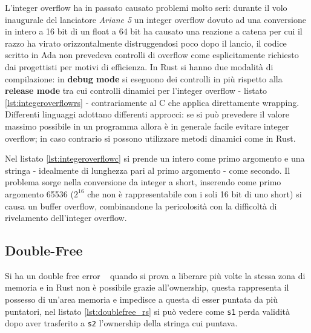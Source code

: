 \documentclass{report}
\begin{document}
L'integer overflow ha in passato causato problemi molto seri: durante il volo inaugurale del lanciatore \textit{Ariane 5} un integer overflow dovuto ad una conversione in intero a 16 bit di un float a 64 bit ha causato una reazione a catena per cui il razzo ha virato orizzontalmente distruggendosi poco dopo il lancio, il codice scritto in Ada non prevedeva controlli di overflow come esplicitamente richiesto dai progettisti per motivi di efficienza. In Rust si hanno due modalità di compilazione: in \textbf{debug mode} si eseguono dei controlli in più rispetto alla \textbf{release mode} tra cui controlli dinamici per l'integer overflow - listato \ref{lst:integeroverflowrs} - contrariamente al C che applica direttamente wrapping. \\
Differenti linguaggi adottano differenti approcci: se si può prevedere il valore massimo possibile in un programma allora è in generale facile evitare integer overflow; in caso contrario si possono utilizzare metodi dinamici come in Rust. 




Nel listato \ref{lst:integeroverflowc} si prende un intero come primo argomento e una stringa - idealmente di lunghezza pari al primo argomento - come secondo. Il problema sorge nella conversione da integer a short, inserendo come primo argomento 65536 ($2^{16}$ che non è rappresentabile con i soli 16 bit di uno short) si causa un buffer overflow, combinandone la pericolosità con la difficoltà di rivelamento dell'integer overflow.




\subsection{Double-Free} \label{sec:double_free}
Si ha un double free error ~\cite[10.4.4]{gollmann:computersecurity} quando si prova a liberare più volte la stessa zona di memoria e in Rust non è possibile grazie all'ownership, questa rappresenta il possesso di un'area memoria e impedisce a questa di esser puntata da più puntatori, nel listato \ref{lst:doublefree_rs} si può vedere come \texttt{s1} perda validità dopo aver trasferito a \texttt{s2} l'ownership della stringa cui puntava.
\end{document}
